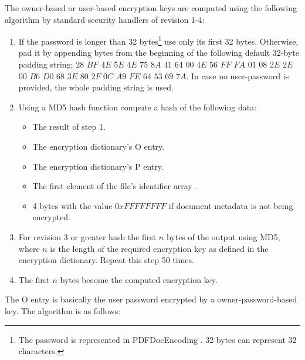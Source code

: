 \documentclass[11pt,oneside]{fithesis2}
\begin{document}
The owner-based or user-based encryption keys are computed using the following algorithm by standard security handlers of revision 1-4: 

\begin{enumerate}
\setlength\itemsep{0.1em}
\item{If the password is longer than 32 bytes\footnote{The password is represented in PDFDocEncoding \cite[157]{pdf_spec}. 32 bytes can represent 32 characters.} use only its first 32 bytes. Otherwise, pad it by appending bytes from the beginning of the following default 32-byte padding string: $28$ $BF$ $4E$ $5E$ $4E$ $75$ $8A$ $41$ $64$ $00$ $4E$ $56$ $FF$ $FA$ $01$ $08$ $2E$ $2E$ $00$ $B6$ $D0$ $68$ $3E$ $80$ $2F$ $0C$ $A9$ $FE$ $64$ $53$ $69$ $7A$. In case no user-password is provided, the whole padding string is used.}
\item{Using a MD5 hash function compute a hash of the following data:}
	\begin{itemize}
		\item{The result of step 1.}
		\item{The encryption dictionary's O entry.}
		\item{The encryption dictionary's P entry.}
		\item{The first element of the file's identifier array \cite[p. 43]{pdf_spec}.}
		\item{4 bytes with the value $0xFFFFFFFF$ if document metadata is not being encrypted.}
	\end{itemize}
\item{For revision 3 or greater hash the first $n$ bytes of the output using MD5, where $n$ is the length of the required encryption key as defined in the encryption dictionary. Repeat this step 50 times.}
\item{The first $n$ bytes become the computed encryption key.}
\end{enumerate}

The O entry is basically the user password encrypted by a owner-password-based key. The algorithm is as follows:
\end{document}
